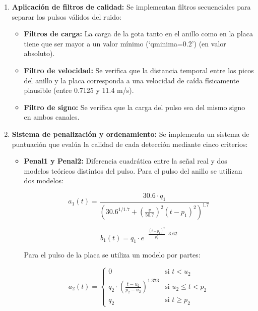 \documentclass[12pt,a4paper]{article}
\begin{document}
\begin{enumerate}
\item \textbf{Aplicación de filtros de calidad:} Se implementan filtros secuenciales para separar
los pulsos válidos del ruido:

\begin{itemize}

\item \textbf{Filtros de carga:} La carga de la gota tanto en el anillo como en la placa tiene
que ser mayor a un valor mínimo (`qminima=0.2') (en valor absoluto).

\item \textbf{Filtro de velocidad:} Se verifica que la distancia temporal entre los picos del
anillo y la placa corresponda a una velocidad de caída físicamente plausible
(entre 0.7125 y 11.4 m/s).

\item \textbf{Filtro de signo:} Se verifica que la carga del pulso sea del mismo signo en
ambos canales.
\end{itemize}

\item \textbf{Sistema de penalización y ordenamiento:} Se implementa un sistema de puntuación que evalúa la calidad de cada detección mediante cinco criterios:

\begin{itemize}

    \item \textbf{Penal1 y Penal2:} Diferencia cuadrática entre la señal real y dos modelos teóricos distintos
    del pulso.
    Para el pulso del anillo se utilizan dos modelos:
    
    \begin{equation}
        a_1(t) = \frac{30.6 \cdot q_1}{\left(30.6^{1/1.7} + \left(\frac{v}{50.7}\right)^2(t-p_1)^2\right)^{1.7}}
    \end{equation}
    
    \begin{equation}
        b_1(t) = q_1 \cdot e^{-\frac{(t-p_1)^2}{p_1^2} \cdot 3.62}
    \end{equation}

    Para el pulso de la placa se utiliza un modelo por partes:

    \begin{equation}
        a_2(t) = \begin{cases}
            0 & \text{si } t < u_2 \\
            q_2 \cdot \left(\frac{t-u_2}{p_2-u_2}\right)^{1.373} & \text{si } u_2 \leq t < p_2 \\
            q_2 & \text{si } t \geq p_2
        \end{cases}
    \end{equation}


\end{itemize}
\end{enumerate}
\end{document}

